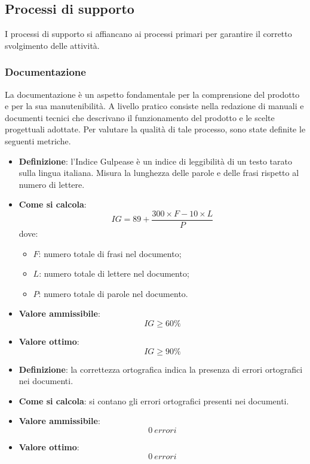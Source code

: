 \subsection{Processi di supporto}
I processi di supporto si affiancano ai processi primari per garantire il corretto svolgimento delle attività.

\subsubsection{Documentazione}
La documentazione è un aspetto fondamentale per la comprensione del prodotto e per la sua manutenibilità. A livello pratico consiste nella redazione di manuali e documenti tecnici che descrivano il funzionamento del prodotto e le scelte progettuali adottate. Per valutare la qualità di tale processo, sono state definite le seguenti metriche.

\begin{itemize}
	\item \textbf{Definizione}: l'Indice Gulpease è un indice di leggibilità di un testo tarato sulla lingua italiana. Misura la lunghezza delle parole e delle frasi rispetto al numero di lettere.
	\item \textbf{Come si calcola}: \begin{equation*}IG = 89 + \frac{300 \times F - 10 \times L}{P}\end{equation*} dove:
		\begin{itemize}
			\item $F$: numero totale di frasi nel documento;
			\item $L$: numero totale di lettere nel documento;
			\item $P$: numero totale di parole nel documento.
		\end{itemize}
	\item \textbf{Valore ammissibile}: \begin{equation*}IG \geq 60\%\end{equation*}
	\item \textbf{Valore ottimo}: \begin{equation*}IG \geq 90\%\end{equation*}
\end{itemize}

\begin{itemize}
	\item \textbf{Definizione}: la correttezza ortografica indica la presenza di errori ortografici nei documenti.
	\item \textbf{Come si calcola}: si contano gli errori ortografici presenti nei documenti.
	\item \textbf{Valore ammissibile}: \begin{equation*}0\ errori\end{equation*}
	\item \textbf{Valore ottimo}: \begin{equation*}0\ errori\end{equation*}
\end{itemize}

